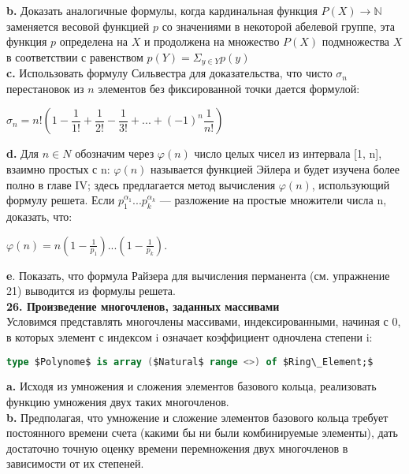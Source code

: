 \documentclass{mai_book}
\begin{document}
\textbf{b.} Доказать аналогичные формулы, когда кардинальная функция $P(X) \rightarrow \mathbb{N}$  заменяется весовой функцией $p$ со значениями в некоторой абелевой группе, эта функция $p$ определена на $X$ и продолжена на множество $P(X)$ подмножества $X$ в соответствии с равенством $p(Y) = \Sigma_{y \in Y} p(y)$\\

\textbf{c.} Использовать формулу Сильвестра для доказательства, что чисто $\sigma_{n}$ перестановок из $n$ элементов без фиксированной точки дается\linebreak
формулой:\\
\begin{center}
$\sigma_{n} = \textit{n!} \left( 1 - \dfrac{1}{1!} + \dfrac{1}{2!} - \dfrac{1}{3!} + ... + (-1)^{\textit{n}} \dfrac{1}{\textit{n!}} \right)$
\end{center}
\newpage

\textbf{d.} Для $n \in N$ обозначим через $\varphi (n)$ число целых чисел из интервала [1, n], взаимно простых с n: $\varphi (n)$ называется функцией Эйлера и будет изучена более полно в главе IV; здесь предлагается метод вычисления $\varphi (n)$, использующий формулу решета. Если $p_{1}^{\alpha_{1}} ... p_{k}^{\alpha_{k}}$ — разложение на простые множители числа n, доказать, что:
\begin{center}
$\varphi (n) = n \left( 1 - \frac{1}{p_{1}} \right) ... \left( 1 - \frac{1}{p_{k}} \right) .$
\end{center}
\hspace*{15pt}\textbf{e}. Показать, что формула Райзера для вычисления перманента (см. упражнение 21) выводится из формулы решета.\\

\noindent
\textbf{26. Произведение многочленов, заданных массивами}\\

Условимся представлять многочлены массивами, индексированными, начиная с 0, в которых элемент с индексом i означает коэффициент одночлена степени i:
\begin{lstlisting}[mathescape=true, frame=none, language=Ada]
type $Polynome$ is array ($Natural$ range <>) of $Ring\_Element;$
\end{lstlisting}
\hspace*{15pt}\textbf{a.} Исходя из умножения и сложения элементов базового кольца, реализовать функцию умножения двух таких многочленов.\\

\textbf{b.} Предполагая, что умножение и сложение элементов базового кольца требует постоянного времени счета (какими бы ни были комбинируемые элементы), дать достаточно точную оценку времени перемножения двух многочленов в зависимости от их степеней.\\
\end{document}
